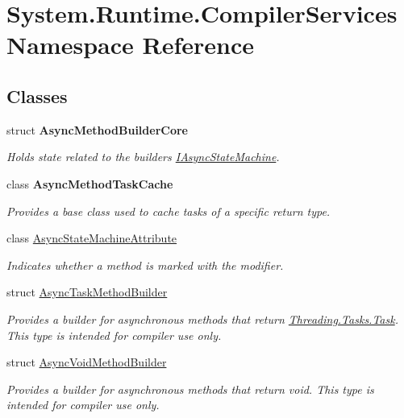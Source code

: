 \hypertarget{namespace_system_1_1_runtime_1_1_compiler_services}{}\section{System.\+Runtime.\+Compiler\+Services Namespace Reference}
\label{namespace_system_1_1_runtime_1_1_compiler_services}
\subsection*{Classes}
\begin{DoxyCompactItemize}
\item 
struct {\bfseries Async\+Method\+Builder\+Core}
\begin{DoxyCompactList}\small\item\em Holds state related to the builder\textquotesingle{}s \hyperlink{interface_system_1_1_runtime_1_1_compiler_services_1_1_i_async_state_machine}{I\+Async\+State\+Machine}.\end{DoxyCompactList}\item 
class {\bfseries Async\+Method\+Task\+Cache}
\begin{DoxyCompactList}\small\item\em Provides a base class used to cache tasks of a specific return type.\end{DoxyCompactList}\item 
class \hyperlink{class_system_1_1_runtime_1_1_compiler_services_1_1_async_state_machine_attribute}{Async\+State\+Machine\+Attribute}
\begin{DoxyCompactList}\small\item\em Indicates whether a method is marked with the  modifier. \end{DoxyCompactList}\item 
struct \hyperlink{struct_system_1_1_runtime_1_1_compiler_services_1_1_async_task_method_builder}{Async\+Task\+Method\+Builder}
\begin{DoxyCompactList}\small\item\em Provides a builder for asynchronous methods that return \hyperlink{class_system_1_1_threading_1_1_tasks_1_1_task}{Threading.\+Tasks.\+Task}. This type is intended for compiler use only. \end{DoxyCompactList}\item 
struct \hyperlink{struct_system_1_1_runtime_1_1_compiler_services_1_1_async_void_method_builder}{Async\+Void\+Method\+Builder}
\begin{DoxyCompactList}\small\item\em Provides a builder for asynchronous methods that return void. This type is intended for compiler use only. \end{DoxyCompactList}\item 

\end{DoxyCompactItemize}
